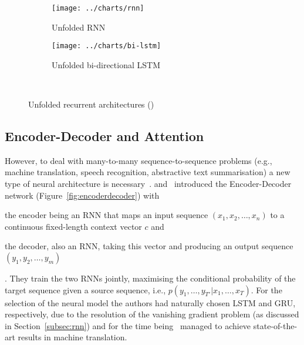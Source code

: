 \begin{figure}[ht]
    \begin{subfigure}{0.49\textwidth}
        \centering
        \texttt{[image: ../charts/rnn]}
        \caption{Unfolded RNN}
        \label{fig:rnn}
    \end{subfigure}%
    \hfill
    \begin{subfigure}{0.49\textwidth}
        \centering
        \texttt{[image: ../charts/bi-lstm]}
        \caption{Unfolded bi-directional LSTM}
        \label{fig:bilstm}
    \end{subfigure}~\caption{Unfolded recurrent architectures (\cite{zhiyong2018bilstm})}
    \label{fig:recurrent_unfolded}
\end{figure}

\subsection{Encoder-Decoder and Attention}\label{subsec:seq2seq}
However, to deal with many-to-many sequence-to-sequence problems (e.g., machine translation, speech recognition, abstractive text summarisation) a new type of neural architecture is necessary~\cite{sutskever2014sequence}.
and~\cite{cho-etal-2014-learning} introduced the Encoder-Decoder network (Figure~\ref{fig:encoderdecoder}) with \begin{enumerate*}
    \item the encoder being an RNN that maps an input sequence $(x_1, x_2, \dots, x_n)$ to a continuous fixed-length context vector $c$ and
    \item the decoder, also an RNN, taking this vector and producing an output sequence $(y_1, y_2, \dots, y_m)$
\end{enumerate*}.
They train the two RNNs jointly, maximising the conditional probability of the target sequence given a source sequence, i.e., $p(y_1, \ldots, y_{T'} | x_1, \ldots, x_T)$.
For the selection of the neural model the authors had naturally chosen LSTM and GRU, respectively, due to the resolution of the vanishing gradient problem (as discussed in Section~\ref{subsec:rnn}) and for the time being~\cite{sutskever2014sequence} managed to achieve state-of-the-art results in machine translation.


